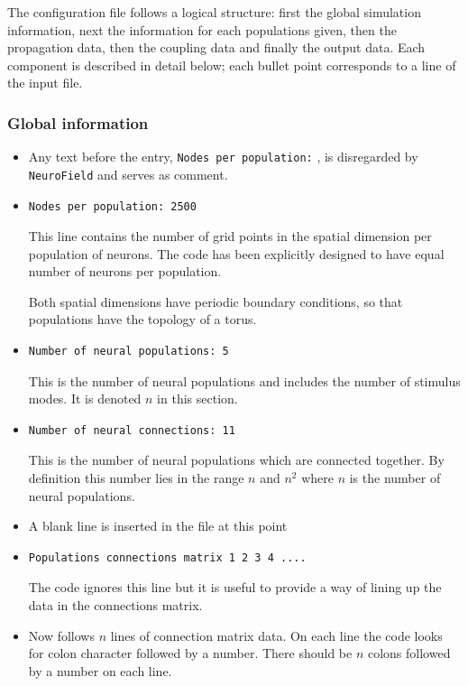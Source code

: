 \documentclass[12pt,a4paper]{article}
\newcommand{\type}[1]{ {\small\small\tt #1} }
\begin{document}
The configuration file follows a logical structure: first the global simulation information, next the information for each populations given, then the propagation data, then the coupling data and finally the output data. Each component is described in detail below; each bullet point corresponds to a line of the input file.

\subsubsection{Global information}
\label{sec:global}
\begin{itemize}

\item Any text before the entry, \type{Nodes per population:}, is disregarded by \type{NeuroField} and serves as comment.
\item
\begin{lstlisting}
Nodes per population: 2500
\end{lstlisting}
This line contains the number of grid points in the spatial dimension per population of neurons. The code has been explicitly designed to have equal number of neurons per population.

Both spatial dimensions have periodic boundary conditions, so that populations have the topology of a torus.
\item
\begin{lstlisting}
Number of neural populations: 5
\end{lstlisting} This is the number of neural
populations and includes the number of stimulus modes. It is denoted
$n$ in this section.
\item
\begin{lstlisting}
Number of neural connections: 11
\end{lstlisting} This is the number of neural
populations which are connected together. By definition this number lies in the
range $n$ and $n^2$ where $n$ is the number of neural populations.
\item A blank line is inserted in the file at this point
\item
\begin{lstlisting}
Populations connections matrix 1 2 3 4 ....
\end{lstlisting} The code ignores this
line but it is useful to provide a way of lining up the data in the
connections matrix.
\item Now follows $n$ lines of connection matrix data. On each line the code looks for colon character followed by a number. There should be $n$ colons followed by a number on each line.
	

\end{itemize}
\end{document}
